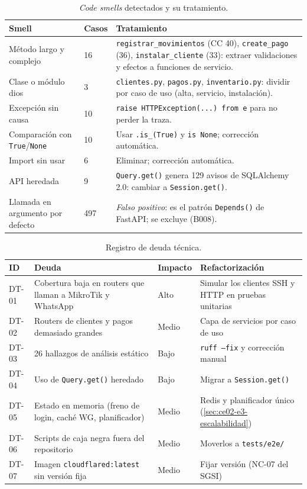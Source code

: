 \begin{table}[H]
\centering
\caption{\emph{Code smells} detectados y su tratamiento.}
\label{tab:ce02-e4-smells}
\small
\begin{tabularx}{\textwidth}{L{3.2cm}C{1.2cm}X}
\toprule
\textbf{Smell} & \textbf{Casos} & \textbf{Tratamiento} \\
\midrule
Método largo y complejo & 16 & \texttt{registrar\_movimientos} (CC 40), \texttt{create\_pago} (36), \texttt{instalar\_cliente} (33): extraer validaciones y efectos a funciones de servicio. \\
Clase o módulo dios & 3 & \texttt{clientes.py}, \texttt{pagos.py}, \texttt{inventario.py}: dividir por caso de uso (alta, servicio, instalación). \\
Excepción sin causa & 10 & \texttt{raise HTTPException(...) from e} para no perder la traza. \\
Comparación con \texttt{True}/\texttt{None} & 10 & Usar \texttt{.is\_(True)} y \texttt{is None}; corrección automática. \\
Import sin usar & 6 & Eliminar; corrección automática. \\
API heredada & 9 & \texttt{Query.get()} genera 129 avisos de SQLAlchemy 2.0: cambiar a \texttt{Session.get()}. \\
Llamada en argumento por defecto & 497 & \emph{Falso positivo}: es el patrón \texttt{Depends()} de FastAPI; se excluye (B008). \\
\bottomrule
\end{tabularx}
\end{table}

\begin{table}[H]
\centering
\caption{Registro de deuda técnica.}
\label{tab:ce02-e4-deuda}
\small
\begin{tabularx}{\textwidth}{L{1cm}XC{1.4cm}L{3.4cm}}
\toprule
\textbf{ID} & \textbf{Deuda} & \textbf{Impacto} & \textbf{Refactorización} \\
\midrule
DT-01 & Cobertura baja en routers que llaman a MikroTik y WhatsApp & Alto & Simular los clientes SSH y HTTP en pruebas unitarias \\
DT-02 & Routers de clientes y pagos demasiado grandes & Medio & Capa de servicios por caso de uso \\
DT-03 & 26 hallazgos de análisis estático & Bajo & \texttt{ruff --fix} y corrección manual \\
DT-04 & Uso de \texttt{Query.get()} heredado & Bajo & Migrar a \texttt{Session.get()} \\
DT-05 & Estado en memoria (freno de login, caché WG, planificador) & Medio & Redis y planificador único (\cref{sec:ce02-e3-escalabilidad}) \\
DT-06 & Scripts de caja negra fuera del repositorio & Medio & Moverlos a \texttt{tests/e2e/} \\
DT-07 & Imagen \texttt{cloudflared:latest} sin versión fija & Medio & Fijar versión (NC-07 del SGSI) \\
\bottomrule
\end{tabularx}
\end{table}

